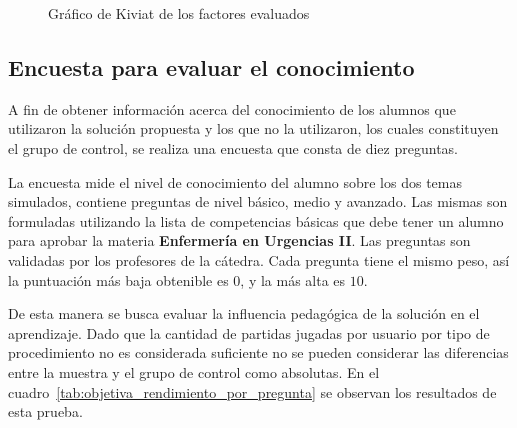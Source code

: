 \begin{figure}
\centering
{}
\label{fig:subjetiva_kiviat}
\caption{Gráfico de Kiviat de los factores evaluados}
\end{figure}

\subsection{Encuesta para evaluar el conocimiento}
\label{encuesta_conocimiento}
A fin de obtener información acerca del conocimiento de los alumnos que 
utilizaron la solución propuesta y los que no la utilizaron, los cuales 
constituyen el grupo de control, se realiza una encuesta que consta de diez 
preguntas.

La encuesta mide el nivel de conocimiento del alumno sobre los dos temas 
simulados, contiene preguntas de nivel básico, medio y avanzado. Las mismas 
son formuladas utilizando la lista de competencias básicas que debe tener un 
alumno para aprobar la materia \textbf{Enfermería en Urgencias II}. Las 
preguntas son validadas  por los profesores de la cátedra. Cada pregunta 
tiene el mismo peso, así la puntuación más baja obtenible es $0$, y la más 
alta es $10$.

De esta manera se busca evaluar la influencia pedagógica  de la
solución en el aprendizaje. Dado que la cantidad de
partidas jugadas por usuario por tipo de procedimiento no es considerada
suficiente no se pueden considerar las diferencias entre la muestra y el grupo
de control como absolutas. En el cuadro~\ref{tab:objetiva_rendimiento_por_pregunta} se observan los resultados de esta prueba.

